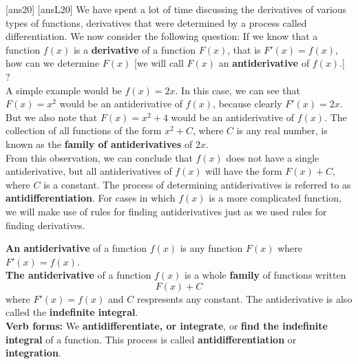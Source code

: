 \newpage
[ans20]
[ansL20]
\noindent We have spent a lot of time discussing the derivatives of various types of functions, derivatives that were determined by a process called differentiation.  We now consider the following question:  If we know that a function $f(x)$ is a \textbf{derivative} of a function $F(x)$, that is   $F'(x)=f(x)$, how can we determine $F(x)$ [we will call $F(x)$ an \textbf{antiderivative} of $f(x)$.] ?  \\

\noindent A simple example would be $f(x)=2x$.  In this case, we can see that $F(x)=x^2$ would be an antiderivative of $f(x)$, because clearly $F'(x)=2x$.  But we also note that $F(x)=x^2+4$ would be an antiderivative of $f(x)$. The collection of all functions of the form $x^2+C$, where $C$ is any real number, is known as the \textbf{family of antiderivatives} of $2x$.  \\

\noindent From this observation, we can conclude that $f(x)$ does not have a single antiderivative, but all antiderivatives of $f(x)$ will have the form $F(x)+C$, where $C$ is a constant.  The process of determining antiderivatives is referred to as \textbf{antidifferentiation}.  For cases in which $f(x)$ is a more complicated function, we will make use of rules for finding antiderivatives just as we used rules for finding derivatives.

\begin{tcolorbox}[title = {Antiderivatives}]

\noindent \textbf{An antiderivative} of a function $f(x)$ is any function $F(x)$ where $F'(x)=f(x)$.\\

\textbf{The antiderivative} of a function $f(x)$ is a whole \textbf{family} of functions written 
$$F(x)+C$$ 
where $F'(x)=f(x)$ and $C$ respresents any constant. The antiderivative is also called the \textbf{indefinite integral}.\\

\textbf{Verb forms:} We \textbf{antidifferentiate, or integrate}, or \textbf{find the indefinite integral} of a function. This process is called \textbf{antidifferentiation} or \textbf{integration}.
\end{tcolorbox}

